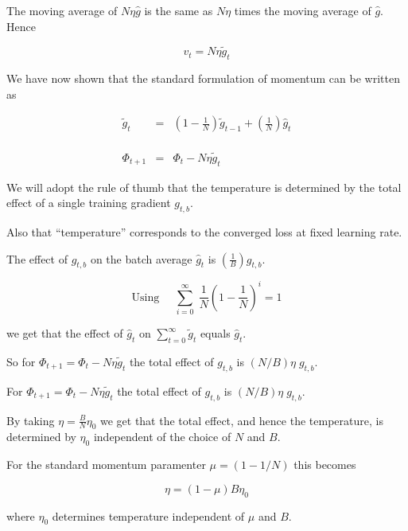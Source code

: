 {\vfill
The moving average of $N\eta\hat{g}$ is the same as $N\eta$ times the moving average of $\hat{g}$.  Hence

\vfill
{\color{red} $$v_t = N \eta \tilde{g}_t$$}


We have now shown that the standard formulation of momentum can be written as

\vfill
\begin{eqnarray*}
\tilde{g}_t & = & \left(1-\frac{1}{N}\right)\tilde{g}_{t-1} + \left(\frac{1}{N}\right) \hat{g}_t \\
\\
\\
\\
\Phi_{t+1} & = &  \Phi_t - N\eta\tilde{g}_t
\end{eqnarray*}


We will adopt the rule of thumb that the temperature is determined by the total effect of a single training gradient $g_{t,b}$.


\vfill
Also that ``temperature'' corresponds to the converged loss at fixed learning rate.


The effect of $g_{t,b}$ on the batch average $\hat{g}_t$ is $\left(\frac{1}{B}\right)g_{t,b}$.

\vfill
$$\mathrm{Using}\;\;\;\;\; \sum_{i = 0}^\infty \;\frac{1}{N}\left(1 - \frac{1}{N}\right)^i = 1$$

\vfill
we get that the effect of $\hat{g}_t$ on $\sum_{t=0}^\infty \tilde{g}_t$ equals $\hat{g}_t$.

\vfill
So for $\Phi_{t+1} =  \Phi_t - N\eta\tilde{g}_t$ the total effect of $g_{t,b}$ is $(N/B)\eta\; g_{t,b}$.



For $\Phi_{t+1} =  \Phi_t - N\eta\tilde{g}_t$ the total effect of $g_{t,b}$ is $(N/B)\eta\; g_{t,b}$.

\vfill
By taking $\eta = \frac{B}{N} \eta_0$ we get that the total effect, and hence the temperature, is determined by $\eta_0$ independent of the choice of $N$ and $B$.

\vfill
For the standard momentum paramenter $\mu = (1 - 1/N)$ this becomes

\vfill
{\color{red} $$\eta = (1-\mu)B \eta_0$$}

\vfill
where $\eta_0$ determines temperature independent of $\mu$ and $B$.


} 


